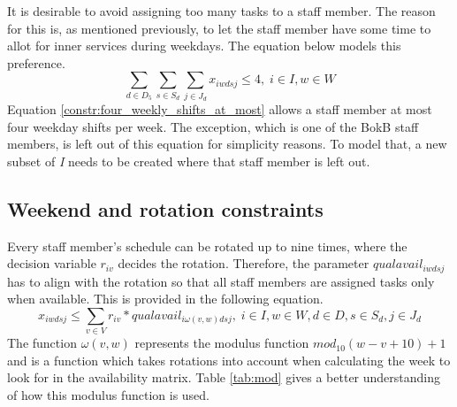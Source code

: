It is desirable to avoid assigning too many tasks to a staff member. The reason for this is, as mentioned previously, to let the staff member have some time to allot for inner services during weekdays. The equation below models this preference.
\begin{equation} \label{constr:four_weekly_shifts_at_most}
\sum_{d \in D_5}\sum_{s \in S_d}\sum_{j \in J_d} x_{iwdsj} \leq 4, \;   i\in I, w \in W
\end{equation}
Equation \ref{constr:four_weekly_shifts_at_most} allows a staff member at most four weekday shifts per week. The exception, which is one of the BokB staff members, is left out of this equation for simplicity reasons. To model that, a new subset of \textit{I} needs to be created where that staff member is left out. 

\subsection{Weekend and rotation constraints} \label{section:weekend_rot_constraints}
Every staff member's schedule can be rotated up to nine times, where the decision variable $r_{iv}$ decides the rotation. Therefore, the parameter $qualavail_{iwdsj}$ has to align with the rotation so that all staff members are assigned tasks only when available. This is provided in the following equation.
\begin{equation} \label{constr:qualavail}
x_{iwdsj} \leq \sum_{v \in V} r_{iv}*qualavail_{i\omega(v,w)dsj}, \;   i \in I, w \in W, d \in D, s \in S_d, j \in J_d
\end{equation}
The function $\omega(v,w)$ represents the modulus function $mod_{10}(w-v+10)+1$ and is a function which takes rotations into account when calculating the week to look for in the availability matrix. Table \ref{tab:mod} gives a better understanding of how this modulus function is used. 

